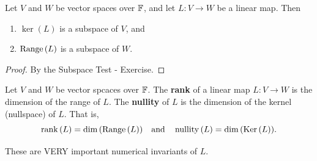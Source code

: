 \begin{theorem}
    Let $V$ and $W$ be vector spaces over ${\mathbb{F}}$, and let $L:V\to W$ be a linear map. Then
    \begin{enumerate}[label={(\alph*)}]
        \item $\ker{(L)}$ is a subspace of $V$, and
        \item $\operatorname{Range}{(L)}$ is a subspace of $W$.
    \end{enumerate}
\end{theorem}

\begin{proof}
    By the Subspace Test - Exercise.
\end{proof}

\begin{definition}
    Let $V$ and $W$ be vector spcaces over ${\mathbb{F}}$. The \textbf{rank} of a linear map $L:V\to W$ is the dimension of the range of $L$.
    The \textbf{nullity} of $L$ is the dimension of the kernel (nullspace) of $L$. That is,
    \[\operatorname{rank}{(L)} = \dim{(\operatorname{Range}{(L)})} \quad \text{and} \quad \operatorname{nullity}{(L)} = \dim{(\operatorname{Ker}{(L)})}.\] 
\end{definition}

\begin{note}
    These are VERY important numerical invariants of $L$.
\end{note}

